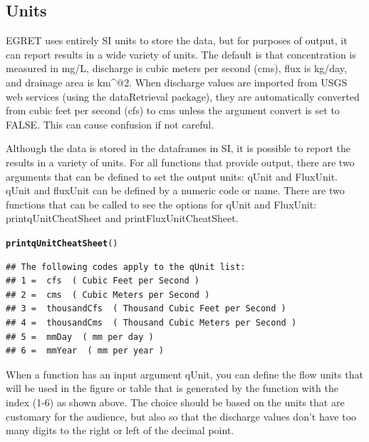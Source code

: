 \documentclass[a4paper,11pt]{article}\usepackage{graphicx, color}
\makeatletter
\newcommand{\hlfunctioncall}[1]{\textcolor[rgb]{0.501960784313725,0,0.329411764705882}{\textbf{#1}}}%
\newenvironment{kframe}{%
 \def\at@end@of@kframe{}%
 \ifinner\ifhmode%
  \def\at@end@of@kframe{\end{minipage}}%
  \begin{minipage}{\columnwidth}%
 \fi\fi%
 \def\FrameCommand##1{\hskip\@totalleftmargin \hskip-\fboxsep
 \colorbox{shadecolor}{##1}\hskip-\fboxsep
     \hskip-\linewidth \hskip-\@totalleftmargin \hskip\columnwidth}%
 \MakeFramed {\advance\hsize-\width
   \@totalleftmargin\z@ \linewidth\hsize
   \@setminipage}}%
 {\par\unskip\endMakeFramed%
 \at@end@of@kframe}
\newenvironment{knitrout}{}{} %
\makeatother
\begin{document}
\FloatBarrier
\pagebreak


\subsection{Units}
\label{sec:units}
EGRET uses entirely SI units to store the data, but for purposes of output, it can report results in a wide variety of units. The default is that concentration is measured in mg/L, discharge is cubic meters per second (cms), flux is kg/day, and drainage area is km\verb@^@2. When discharge values are imported from USGS web services (using the dataRetrieval package), they are automatically converted from cubic feet per second (cfs) to cms unless the argument convert is set to FALSE.  This can cause confusion if not careful. 

Although the data is stored in the dataframes in SI, it is possible to report the results in a variety of units. For all functions that provide output, there are two arguments that can be defined to set the output units: qUnit and FluxUnit.  qUnit and fluxUnit can be defined by a numeric code or name.  There are two functions that can be called to see the options for qUnit and FluxUnit: printqUnitCheatSheet and printFluxUnitCheatSheet.


\begin{knitrout}
\color{fgcolor}\begin{kframe}
\begin{alltt}
\hlfunctioncall{printqUnitCheatSheet}()
\end{alltt}
\begin{verbatim}
## The following codes apply to the qUnit list:
## 1 =  cfs  ( Cubic Feet per Second )
## 2 =  cms  ( Cubic Meters per Second )
## 3 =  thousandCfs  ( Thousand Cubic Feet per Second )
## 4 =  thousandCms  ( Thousand Cubic Meters per Second )
## 5 =  mmDay  ( mm per day )
## 6 =  mmYear  ( mm per year )
\end{verbatim}
\end{kframe}
\end{knitrout}


When a function has an input argument qUnit, you can define the flow units that will be used in the figure or table that is generated by the function with the index (1-6) as shown above. The choice should be based on the units that are customary for the audience, but also so that the discharge values don't have too many digits to the right or left of the decimal point.
\end{document}
